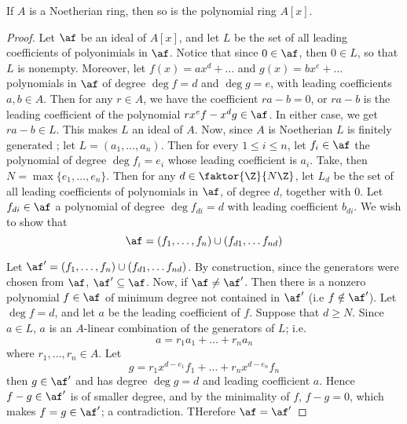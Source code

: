 \begin{theorem}\label{1.12.3}
    If $A$ is a Noetherian ring, then so is the polynomial ring $A[x]$.
\end{theorem}
\begin{proof}
    Let $\af$ be an ideal of  $A[x]$, and let $L$ be the set of all leading
    coefficients of polyonimials in $\af$. Notice that since  $0 \in \af$, then  $0
    \in L$, so that $L$ is nonempty. Moreover, let $f(x)=ax^d+\dots$ and
    $g(x)=bx^e+\dots$ polynomials in $\af$ of degree  $\deg{f}=d$ and $\deg{g}=e$,
    with leading coefficients $a, b \in A$. Then for any  $r \in A$, we have the
    coefficient  $ra-b=0$, or  $ra-b$ is the leading coefficient of the
    polynomial  $rx^ef-x^dg \in \af$. In either case, we get  $ra-b \in L$. This
    makes  $L$ an ideal of  $A$. Now, since  $A$ is Noetherian  $L$ is finitely
    generated ; let $L=(a_1, \dots, a_n)$. Then for every $1 \leq  i \leq n$,
    let  $f_i \in \af$ the polynomial of degree  $\deg{f_i}=e_i$ whose leading
    coefficient is $a_i$. Take, then  $N=\max{\{e_1, \dots, e_n\}}$. Then for
    any $d \in \faktor{\Z}{N\Z}$, let $L_d$ be the set of all leading
    coefficients of polynomials in  $\af$, of degree $d$, together with $0$. Let
    $f_{di} \in \af$ a polynomial of degree $\deg{f_{di}}=d$ with leading
    coefficient $b_{di}$. We wish to show that
    \begin{equation*}
        \af=(f_1, \dots, f_n) \cup (f_{d1}, \dots f_{nd})
    \end{equation*}

    Let $\af'=(f_1, \dots, f_n) \cup (f_{d1}, \dots f_{nd})$. By construction,
    since the generators were chosen from $\af$,  $\af' \subseteq \af$. Now, if
    $\af \neq \af'$. Then there is a nonzero polynomial $f \in \af$ of minimum degree
     not contained in $\af'$  (i.e $f \notin \af'$). Let $\deg{f}=d$, and let $a$ be
     the leading coefficient of  $f$. Suppose that  $d \geq N$. Since  $a \in
     L$, $a$ is an  $A$-linear combination of the generators of  $L$; i.e.
     \begin{equation*}
         a=r_1a_1+\dots+r_na_n
     \end{equation*}
     where $r_1, \dots, r_n \in A$. Let
     \begin{equation*}
        g=r_1x^{d-e_1}f_1+\dots+r_nx^{d-e_n}f_n
     \end{equation*}
     then $g \in \af'$ and has degree $\deg{g}=d$ and leading coefficient $a$.
     Hence  $f-g \in \af'$ is of smaller degree, and by the minimality of  $f$,
     $f-g=0$, which makes  $f=g \in \af'$; a contradiction. THerefore $\af=\af'$


\end{proof}
